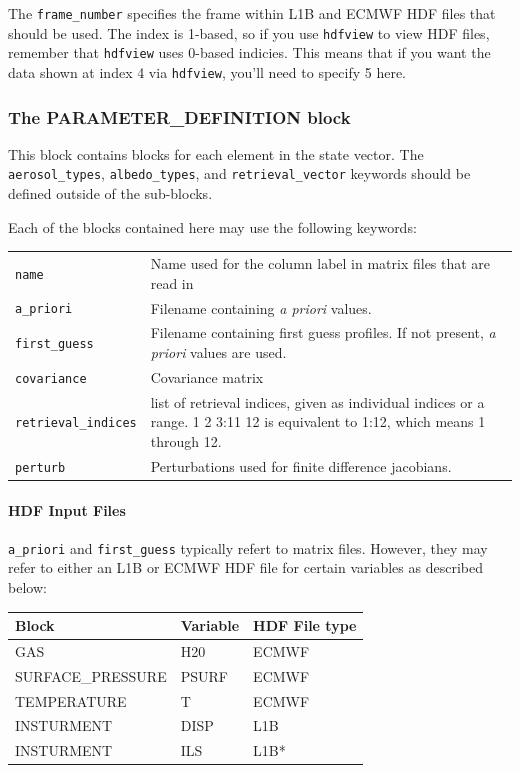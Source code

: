 \documentclass{article}
\begin{document}
The \texttt{frame\_number} specifies the frame within L1B and ECMWF HDF
  files that should be used. The index is 1-based, so if you use \texttt{hdfview} to
	view HDF files, remember that \texttt{hdfview} uses 0-based indicies. This means that
	if you want the data shown at index 4 via \texttt{hdfview}, you'll need to specify 5
	here.

\subsubsection{The PARAMETER\_DEFINITION block}

This block contains blocks for each element in the state vector.  The
\texttt{aerosol\_types}, \texttt{albedo\_types}, and
\texttt{retrieval\_vector} keywords should be defined outside of the
sub-blocks.

Each of the blocks contained here may use the following keywords:

\begin{tabular}{|l|p{3.75in}|}
\hline
\texttt{name}  &Name used for the column label in matrix files that are read in \\
\texttt{a\_priori} & Filename containing \textit{a priori\/} values.\\
\texttt{first\_guess}      & Filename containing first guess profiles.  If not present, \textit{a priori\/} values are used.\\
\texttt{covariance}      & Covariance matrix\\
\texttt{retrieval\_indices}      & list of retrieval indices, given as individual indices or a range.  1 2 3:11 12 is equivalent to 1:12, which means 1 through 12.\\
\texttt{perturb}      & Perturbations used for finite difference jacobians.\\
\hline
\end{tabular}


\paragraph{HDF Input Files}

\texttt{a\_priori} and \texttt{first\_guess} typically refert to matrix
	files.  However, they may refer to either an L1B or ECMWF HDF file for
	certain variables as described below:

\begin{tabular}{|l|l|l|}
\hline
Block &Variable &HDF File type \\
\hline
GAS &H20 &ECMWF \\
SURFACE\_PRESSURE &PSURF &ECMWF \\
TEMPERATURE &T &ECMWF \\
INSTURMENT &DISP &L1B \\
INSTURMENT &ILS &L1B* \\
\hline
\end{tabular}
\end{document}

